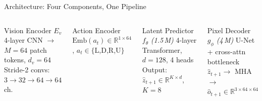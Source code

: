 \documentclass[aspectratio=169,10pt]{beamer}
\begin{document}
\begin{frame}{Architecture: Four Components, One Pipeline}

\begin{columns}[T]

\begin{block}{Vision Encoder $E_v$}
\footnotesize 4-layer CNN $\to$ $M{=}64$ patch tokens, $d_v{=}64$\\
Stride-2 convs: $3{\to}32{\to}64{\to}64$ ch.
\end{block}\vspace{2pt}

\begin{block}{Action Encoder}
\footnotesize $\text{Emb}(a_t) \in \mathbb{R}^{1\times64}$,\; $a_t\in\{$L,D,R,U$\}$
\end{block}\vspace{2pt}

\begin{block}{Latent Predictor $f_\theta$ \emph{(1.5\,M)}}
\footnotesize 4-layer Transformer, $d{=}128$, 4 heads\\
Output: $\hat{z}_{t+1} \in \mathbb{R}^{K\times d}$,\; $K{=}8$
\end{block}\vspace{2pt}

\begin{block}{Pixel Decoder $g_\phi$ \emph{(4\,M)}}
\footnotesize U-Net + cross-attn bottleneck\\
$\hat{z}_{t+1}{\to}$ MHA ${\to}$ $\hat{o}_{t+1} \in \mathbb{R}^{3\times64\times64}$
\end{block}


\end{columns}
\end{frame}
\end{document}
